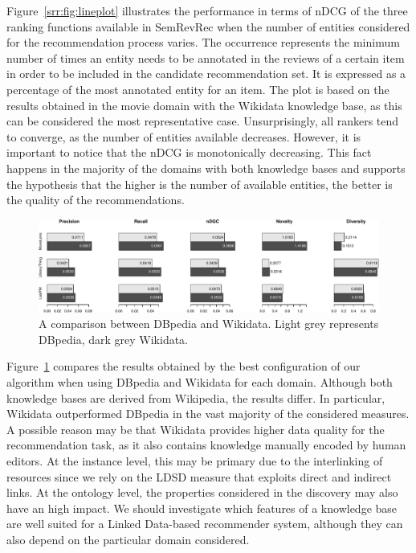 Figure~\ref{srr:fig:lineplot} illustrates the performance in terms of nDCG of the three ranking functions available in SemRevRec when the number of entities considered for the recommendation process varies. The occurrence represents the minimum number of times an entity needs to be annotated in the reviews of a certain item in order to be included in the candidate recommendation set. It is expressed as a percentage of the most annotated entity for an item. The plot is based on the results obtained in the movie domain with the Wikidata knowledge base, as this can be considered the most representative case. Unsurprisingly, all rankers tend to converge, as the number of entities available decreases. However, it is important to notice that the nDCG is monotonically decreasing. This fact happens in the majority of the domains with both knowledge bases and supports the hypothesis that the higher is the number of available entities, the better is the quality of the recommendations.

\begin{figure}
\centering
\includegraphics[width=\textwidth]{barplot}
\caption[Comparison between DBpedia and Wikidata]{A comparison between DBpedia and Wikidata. Light grey represents DBpedia, dark grey Wikidata.}
\label{srr:fig:barplot}
\end{figure}

Figure~\ref{srr:fig:barplot} compares the results obtained by the best configuration of our algorithm when using DBpedia and Wikidata for each domain. Although both knowledge bases are derived from Wikipedia, the results differ. In particular, Wikidata outperformed DBpedia in the vast majority of the considered measures. A possible reason may be that Wikidata provides higher data quality for the recommendation task, as it also contains knowledge manually encoded by human editors. At the instance level, this may be primary due to the interlinking of resources since we rely on the LDSD measure that exploits direct and indirect links. At the ontology level, the properties considered in the discovery may also have an high impact. We should investigate which features of a knowledge base are well suited for a Linked Data-based recommender system, although they can also depend on the particular domain considered.

